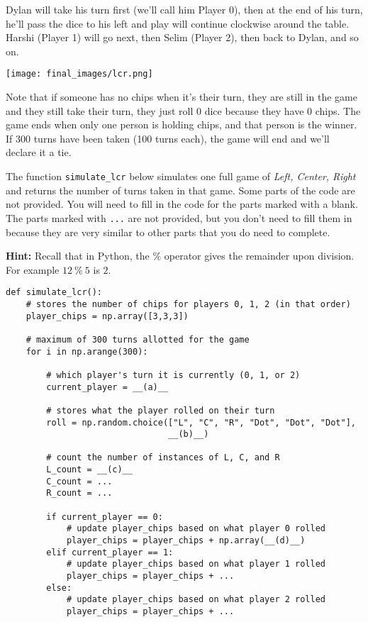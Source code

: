 \documentclass[twoside,12pt]{article}
\begin{document}
{Dylan will take his turn first (we'll call him Player 0), then at the end of his turn, he'll pass the dice to his left and play will continue clockwise around the table. Harshi (Player 1) will go next, then Selim (Player 2), then back to Dylan, and so on. 

\begin{center}
\texttt{[image: final\_images/lcr.png]}
\end{center}

Note that if someone has no chips when it's their turn, they are still in the game and they still take their turn, they just roll 0 dice because they have 0 chips.  The game ends when only one person is holding chips, and that person is the winner. If 300 turns have been taken (100 turns each), the game will end and we'll declare it a tie.

\newpage

The function \texttt{simulate\_lcr} below simulates one full game of \textit{Left, Center, Right} and returns the number of turns taken in that game. Some parts of the code are not provided. You will need to fill in the code for the parts marked with a blank. The parts marked with \texttt{...} are not provided, but you don't need to fill them in because they are very similar to other parts that you do need to complete.

\textbf{Hint:} Recall that in Python, the $\%$ operator gives the remainder upon division. For example $12~\%~5$ is $2$.

\begin{verbatim}
def simulate_lcr():
    # stores the number of chips for players 0, 1, 2 (in that order)
    player_chips = np.array([3,3,3]) 
    
    # maximum of 300 turns allotted for the game
    for i in np.arange(300): 
    
        # which player's turn it is currently (0, 1, or 2)
        current_player = __(a)__
    
        # stores what the player rolled on their turn
        roll = np.random.choice(["L", "C", "R", "Dot", "Dot", "Dot"], 
                                __(b)__) 
    
        # count the number of instances of L, C, and R
        L_count = __(c)__
        C_count = ...
        R_count = ...
    
        if current_player == 0:
            # update player_chips based on what player 0 rolled
            player_chips = player_chips + np.array(__(d)__)
        elif current_player == 1:
            # update player_chips based on what player 1 rolled
            player_chips = player_chips + ...
        else:
            # update player_chips based on what player 2 rolled
            player_chips = player_chips + ...
        

\end{verbatim}}
\end{document}
